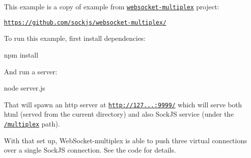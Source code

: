 This example is a copy of example from \href{https://github.com/sockjs/websocket-multiplex/}{\tt websocket-\/multiplex} project\+:


\begin{DoxyItemize}
\item \href{https://github.com/sockjs/websocket-multiplex/}{\tt https\+://github.\+com/sockjs/websocket-\/multiplex/}
\end{DoxyItemize}

To run this example, first install dependencies\+: \begin{DoxyVerb}npm install
\end{DoxyVerb}


And run a server\+: \begin{DoxyVerb}node server.js
\end{DoxyVerb}


That will spawn an http server at \href{http://127.0.0.1:9999/}{\tt http\+://127...\+:9999/} which will serve both html (served from the current directory) and also Sock\+JS service (under the \href{http://127.0.0.1:9999/multiplex}{\tt /multiplex} path).

With that set up, Web\+Socket-\/multiplex is able to push three virtual connections over a single Sock\+JS connection. See the code for details. 